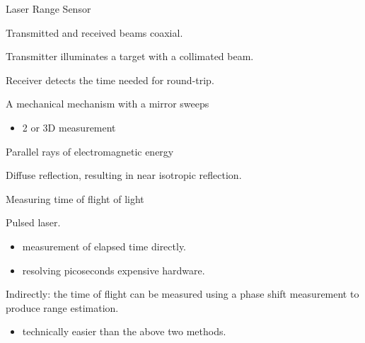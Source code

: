 \documentclass[compress]{beamer}
\begin{document}
\begin{frame}{Laser Range Sensor}

Transmitted and received beams coaxial.

Transmitter illuminates a target with a collimated beam.

Receiver detects the time needed for round-trip.

A mechanical mechanism with a mirror sweeps

\begin{itemize}

\item
  2 or 3D measurement
\end{itemize}

Parallel rays of electromagnetic energy

Diffuse reflection, resulting in near isotropic reflection.

\end{frame}

\begin{frame}{Measuring time of flight of light}

Pulsed laser.

\begin{itemize}

\item
  measurement of elapsed time directly.
\item
  resolving picoseconds \rightarrow expensive hardware.
\end{itemize}

Indirectly: the time of flight can be measured using a phase shift
measurement to produce range estimation.

\begin{itemize}

\item
  technically easier than the above two methods.
\end{itemize}

\end{frame}
\end{document}
